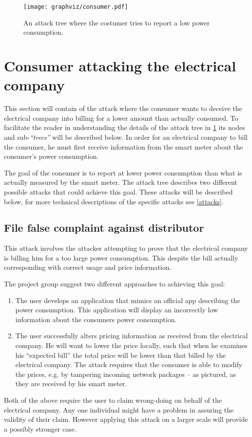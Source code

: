 
\begin{figure}
  \texttt{[image: graphviz/consumer.pdf]}
  \caption{An attack tree where the costumer tries to report a low power consumption.}
  \label{report_power_attack_tree}
\end{figure}

\section{Consumer attacking the electrical company}
This section will contain of the attack where the consumer wants to deceive the electrical company into billing for a lower amount than actually consumed.
To facilitate the reader in understanding the details of the attack tree in \cref{report_power_attack_tree} its nodes and sub-\emph{``trees''} will be described below.
In order for an electrical company to bill the consumer, he must first receive information from the smart meter about the consumer's power consumption.

The goal of the consumer is to report at lower power consumption than what is actually measured by the smart meter.
The attack tree describes two different possible attacks that could achieve this goal.
These attacks will be described below, for more technical descriptions of the specific attacks see \cref{attacks}.

\subsection{File false complaint against distributor}
This attack involves the attacker attempting to prove that the electrical company is billing him for a too large power consumption.
This despite the bill actually corresponding with correct usage and price information.

The project group suggest two different approaches to achieving this goal:
\begin{enumerate}
  \item The user develops an application that mimics an official app describing the power consumption.
  This application will display an incorrectly low information about the consumers power consumption.
  \item The user successfully alters pricing information as received from the electrical company.
  He will want to lower the price locally, such that when he examines his ``expected bill'' the total price will be lower than that billed by the electrical company.
  The attack requires that the consumer is able to modify the prices, e.g. by tampering incoming network packages -- as pictured, as they are received by his smart meter.
\end{enumerate}
Both of the above require the user to claim wrong-doing on behalf of the electrical company.
Any one individual might have a problem in assuring the validity of their claim.
However applying this attack on a larger scale will provide a possibly stronger case.

